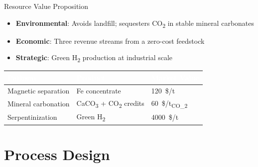 \documentclass[aspectratio=169]{beamer}
\begin{document}
\begin{frame}{Resource Value Proposition}
\begin{itemize}
    \item \textbf{Environmental}: Avoids landfill; sequesters CO\textsubscript{2} in stable mineral carbonates
    \item \textbf{Economic}: Three revenue streams from a zero-cost feedstock
    \item \textbf{Strategic}: Green H\textsubscript{2} production at industrial scale
\end{itemize}
\vspace{12pt}
\centering
\begin{tabular}{@{}lll@{}}
\toprule
\textbf{\textcolor{white}{Pathway}} & \textbf{\textcolor{white}{Product}} & \textbf{\textcolor{white}{Market Value}} \\
\midrule
Magnetic separation & Fe concentrate & \SI{120}{\$/t} \\
Mineral carbonation & CaCO\textsubscript{3} + CO\textsubscript{2} credits & \SI{60}{\$/t_{CO_2}} \\
Serpentinization    & Green H\textsubscript{2} & \SI{4000}{\$/t} \\
\bottomrule
\end{tabular}
\end{frame}

\section{Process Design}
\end{document}

